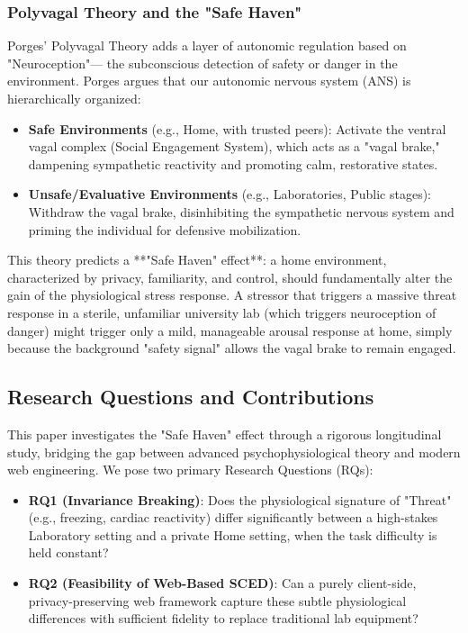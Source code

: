 \documentclass[journal]{IEEEtran}
\begin{document}
\subsubsection{Polyvagal Theory and the "Safe Haven"}
Porges' Polyvagal Theory \cite{polyvagal, porges_safe_haven} adds a layer of autonomic regulation based on "Neuroception"—
the subconscious detection of safety or danger in the environment. Porges argues that our autonomic nervous system (ANS) is hierarchically organized:
\begin{itemize}
    \item \textbf{Safe Environments} (e.g., Home, with trusted peers): Activate the ventral vagal complex (Social Engagement System), 
    which acts as a "vagal brake," dampening sympathetic reactivity and promoting calm, restorative states.
    \item \textbf{Unsafe/Evaluative Environments} (e.g., Laboratories, Public stages): Withdraw the vagal brake, 
    disinhibiting the sympathetic nervous system and priming the individual for defensive mobilization.
\end{itemize}
This theory predicts a **"Safe Haven" effect**: a home environment, characterized by privacy, familiarity, and control, 
should fundamentally alter the gain of the physiological stress response. A stressor that triggers a massive threat response 
in a sterile, unfamiliar university lab (which triggers neuroception of danger) might trigger only a mild, manageable arousal response at home, 
simply because the background "safety signal" allows the vagal brake to remain engaged.

\subsection{Research Questions and Contributions}
This paper investigates the "Safe Haven" effect through a rigorous longitudinal study, bridging the gap between advanced psychophysiological theory and modern web engineering.
We pose two primary Research Questions (RQs):
\begin{itemize}
    \item \textbf{RQ1 (Invariance Breaking)}: Does the physiological signature of "Threat" (e.g., freezing, cardiac reactivity) 
    differ significantly between a high-stakes Laboratory setting and a private Home setting, when the task difficulty is held constant?
    \item \textbf{RQ2 (Feasibility of Web-Based SCED)}: Can a purely client-side, privacy-preserving web framework 
    capture these subtle physiological differences with sufficient fidelity to replace traditional lab equipment?
\end{itemize}
\end{document}
